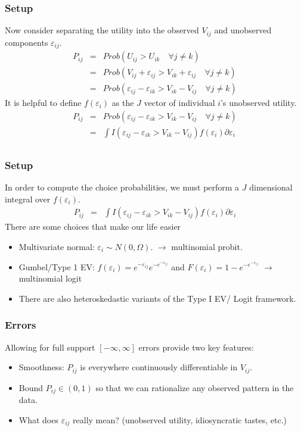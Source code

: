 \documentclass[xcolor=pdftex,dvipsnames,table,mathserif]{beamer}
\begin{document}
\begin{frame}
\frametitle{Setup}
Now consider separating the utility into the observed $V_{ij}$ and unobserved components $\varepsilon_{ij}$.
\begin{eqnarray*}
P_{ij} &=& Prob( U_{ij} > U_{ik} \quad \forall j \neq k)\\
 &=& Prob( V_{ij} + \varepsilon_{ij} > V_{ik} + \varepsilon_{ij} \quad \forall j \neq k)\\
 &=& Prob( \varepsilon_{ij}-\varepsilon_{ik} > V_{ik} - V_{ij} \quad \forall j \neq k)
\end{eqnarray*}
\pause
It is helpful to define $f(\varepsilon_{i})$ as the $J$ vector of individual $i$'s unobserved utility.
\begin{eqnarray*}
P_{ij} &=& Prob( \varepsilon_{ij}-\varepsilon_{ik} > V_{ik} - V_{ij} \quad \forall j \neq k)\\
&=& \int I( \varepsilon_{ij}-\varepsilon_{ik} > V_{ik} - V_{ij} ) f( \varepsilon_i) \partial \varepsilon_i \\
\end{eqnarray*}
\end{frame}

\begin{frame}
\frametitle{Setup}
In order to compute the choice probabilities, we must perform a $J$ dimensional integral over $f(\varepsilon_i)$.
\begin{eqnarray*}
P_{ij} &=&  \int I( \varepsilon_{ij}-\varepsilon_{ik} > V_{ik} - V_{ij} ) f( \varepsilon_i) \partial \varepsilon_i 
\end{eqnarray*}
There are some choices that make our life easier
\begin{itemize}
\item Multivariate normal: $\varepsilon_i  \sim N(0,\Omega)$. $\longrightarrow$ \alert{ multinomial probit}.
\item Gumbel/Type 1 EV: $f(\varepsilon_i) = e^{-\varepsilon_{ij}}  e^{-e^{-\varepsilon_{ij}}}  $ and $F(\varepsilon_i) = 1- e^{-e^{-\varepsilon_{ij}}}$ $\longrightarrow$ \alert{multinomial logit}
\item There are also heteroskedastic variants of the Type I EV/ Logit framework.
\end{itemize}
\end{frame}

\begin{frame}
\frametitle{Errors}
Allowing for full support $[-\infty, \infty]$ errors provide two key features:
\begin{itemize}
\item Smoothness: $P_{ij}$ is everywhere continuously differentiable in $V_{ij}$.
\item Bound $P_{ij} \in (0,1)$ so that we can rationalize any observed pattern in the data.
\item What does $\varepsilon_{ij}$ really mean? (unobserved utility, idiosyncratic tastes, etc.)
\end{itemize}
\end{frame}
\end{document}
